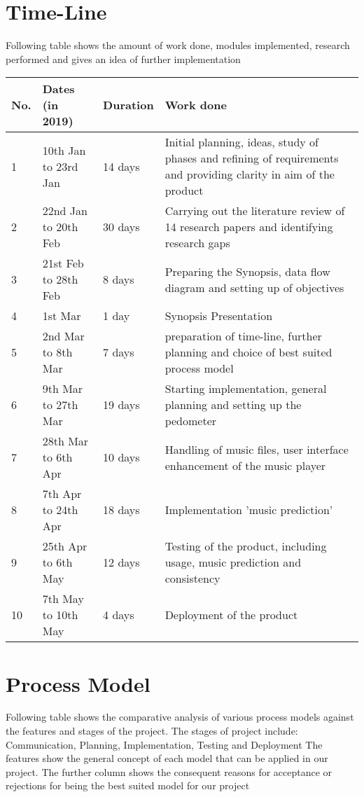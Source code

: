 \documentclass[10pt, a4paper]{article}
\begin{document}
\section{Time-Line}
Following table shows the amount of work done, modules implemented, research performed and gives an idea of further implementation
\begin{center}
\bigbreak
\begin{tabular}{ | m{0.5cm} | m{3.5cm}| m{2cm} | m{9cm}|}
\hline
\hline
No. & Dates (in 2019)& Duration & Work done\\
\hline
\hline 
1 & 10th Jan to 23rd Jan & 14 days & Initial planning, ideas, study of phases and refining of requirements and providing clarity in aim of the product\\
\hline
2 & 22nd Jan to 20th Feb & 30 days & Carrying out the literature review of 14 research papers and identifying research gaps\\
\hline
3 & 21st Feb to 28th Feb & 8 days & Preparing the Synopsis, data flow diagram and setting up of objectives\\
\hline
4 & 1st Mar & 1 day & Synopsis Presentation\\
\hline
5 & 2nd Mar to 8th Mar & 7 days & preparation of time-line, further planning and choice of best suited process model\\
\hline
6 & 9th Mar to 27th Mar & 19 days & Starting implementation, general planning and setting up the pedometer\\
\hline
7 & 28th Mar to 6th Apr & 10 days & Handling of music files, user interface enhancement of the music player\\
\hline
8 & 7th Apr to 24th Apr & 18 days & Implementation 'music prediction' \\
\hline
9 & 25th Apr to 6th May & 12 days & Testing of the product, including usage, music prediction and consistency\\
\hline
10 & 7th May to 10th May & 4 days & Deployment of the product\\
\hline
\end{tabular}
\end{center}



\section{Process Model}
Following table shows the comparative analysis of various process models against the features and stages of the project. The stages of project include: Communication, Planning, Implementation, Testing and Deployment The features show the general concept of each model that can be applied in our project. The further column shows the consequent reasons for acceptance or rejections for being the best suited model for our project  
\end{document}

